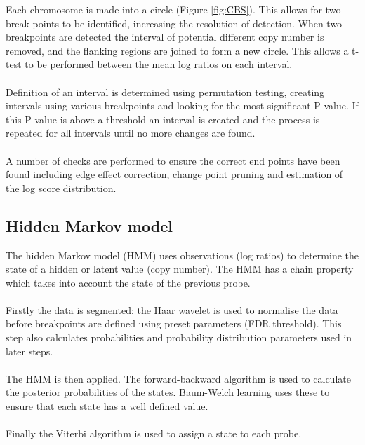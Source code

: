 Each chromosome is made into a circle (Figure \ref{fig:CBS}). This allows for two break points to be identified, increasing the resolution of detection. When two breakpoints are detected the interval of potential different copy number is removed, and the flanking regions are joined to form a new circle. This allows a t-test to be performed between the mean log ratios on each interval. 
\paragraph*{}
Definition of an interval is determined using permutation testing, creating intervals using various breakpoints and looking for the most significant P value. If this P value is above a threshold an interval is created and the process is repeated for all intervals until no more changes are found.
\paragraph*{}
A number of checks are performed to ensure the correct end points have been found including edge effect correction, change point pruning and estimation of the log score distribution.

\subsection{Hidden Markov model}
The hidden Markov model (HMM) \cite{agilent_technologies_agilent_2011} uses observations (log ratios) to determine the state of a hidden or latent value (copy number). The HMM has a chain property which takes into account the state of the previous probe.
\paragraph*{}
Firstly the data is segmented: the Haar wavelet is used to normalise the data before breakpoints are defined using preset parameters (FDR threshold). This step also calculates probabilities and probability distribution parameters used in later steps.
\paragraph*{}
The HMM is then applied. The forward-backward algorithm is used to calculate the posterior probabilities of the states. Baum-Welch learning uses these to ensure that each state has a well defined value.
\paragraph*{}
Finally the Viterbi algorithm is used to assign a state to each probe.

